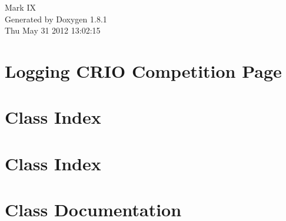 \documentclass{book}
\begin{document}
\hypersetup{pageanchor=false,citecolor=blue}
\begin{titlepage}
\vspace*{7cm}
\begin{center}
{\Large Mark I\-X }\\
\vspace*{1cm}
{\large Generated by Doxygen 1.8.1}\\
\vspace*{0.5cm}
{\small Thu May 31 2012 13:02:15}\\
\end{center}
\end{titlepage}
\clearemptydoublepage
{}
\tableofcontents
\clearemptydoublepage
{}
\hypersetup{pageanchor=true,citecolor=blue}
\chapter{Logging C\-R\-I\-O Competition Page}
\label{index}\hypertarget{index}{}
\chapter{Class Index}

\chapter{Class Index}

\chapter{Class Documentation}




























\printindex
\end{document}

